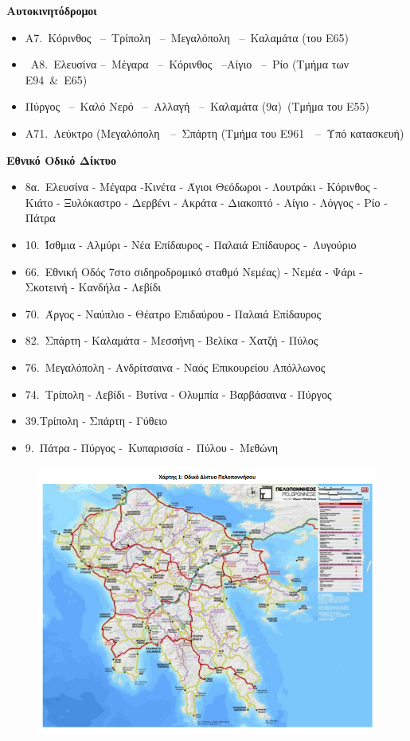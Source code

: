 \documentclass[12pt]{article}
\begin{document}
\begin{enumerate}
		\textbf{Αυτοκινητόδρομοι}
		\begin{itemize}
			\item Α7. Κόρινθος  – Τρίπολη  – Μεγαλόπολη  – Καλαμάτα (του Ε65)
			\item Α8. Ελευσίνα – Μέγαρα  – Κόρινθος  –Αίγιο  – Ρίο (Τμήμα των Ε94 \& Ε65)
			\item Πύργος  – Καλό Νερό  – Αλλαγή  – Καλαμάτα (9α) (Τμήμα του Ε55)
			\item Α71. Λεύκτρο (Μεγαλόπολη  – Σπάρτη (Τμήμα του Ε961  – Υπό κατασκευή)
		\end{itemize}
		\textbf{Εθνικό Οδικό Δίκτυο}
		\begin{itemize}
			\item 8α. Ελευσίνα - Μέγαρα  -Κινέτα - Άγιοι Θεόδωροι - Λουτράκι - Κόρινθος - Κιάτο - Ξυλόκαστρο - Δερβένι  - Ακράτα - Διακοπτό - Αίγιο - Λόγγος - Ρίο - Πάτρα
			\item 10. Ίσθμια - Αλμύρι - Νέα Επίδαυρος - Παλαιά Επίδαυρος - Λυγούριο
			\item 66. Εθνική Οδός 7στο σιδηροδρομικό σταθμό Νεμέας) - Νεμέα - Ψάρι - Σκοτεινή - Κανδήλα - Λεβίδι
			\item 70. Άργος - Ναύπλιο - Θέατρο Επιδαύρου - Παλαιά Επίδαυρος 
			\item 82. Σπάρτη - Καλαμάτα - Μεσσήνη - Βελίκα - Χατζή - Πύλος
			\item 76. Μεγαλόπολη - Ανδρίτσαινα - Ναός Επικουρείου Απόλλωνος
			\item 74. Τρίπολη - Λεβίδι - Βυτίνα - Ολυμπία - Βαρβάσαινα - Πύργος
			\item 39.Τρίπολη - Σπάρτη - Γύθειο
			\item 9. Πάτρα - Πύργος - Κυπαρισσία - Πύλου - Μεθώνη
		\end{itemize}
		\begin{figure} [H]
			\begin{center}
				\includegraphics [scale = 0.60] {peloponnisos2.png}

\end{center}
\end{figure}
\end{enumerate}
\end{document}
